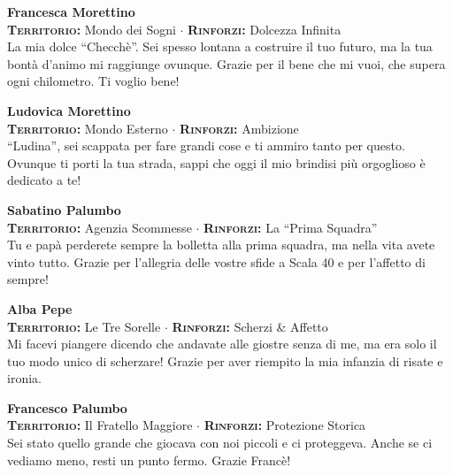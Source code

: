 \noindent\begin{minipage}{\linewidth}
\textbf{Francesca Morettino} \\
{\footnotesize \textbf{\textsc{Territorio:}} Mondo dei Sogni $\cdot$ \textbf{\textsc{Rinforzi:}} Dolcezza Infinita} \\
La mia dolce ``Checchè''. Sei spesso lontana a costruire il tuo futuro, ma la tua bontà d'animo mi raggiunge ovunque. Grazie per il bene che mi vuoi, che supera ogni chilometro. Ti voglio bene!
\end{minipage}
\vspace{0.6cm}

\noindent\begin{minipage}{\linewidth}
\textbf{Ludovica Morettino} \\
{\footnotesize \textbf{\textsc{Territorio:}} Mondo Esterno $\cdot$ \textbf{\textsc{Rinforzi:}} Ambizione} \\
``Ludina'', sei scappata per fare grandi cose e ti ammiro tanto per questo. Ovunque ti porti la tua strada, sappi che oggi il mio brindisi più orgoglioso è dedicato a te!
\end{minipage}
\vspace{0.6cm}

\noindent\begin{minipage}{\linewidth}
\textbf{Sabatino Palumbo} \\
{\footnotesize \textbf{\textsc{Territorio:}} Agenzia Scommesse $\cdot$ \textbf{\textsc{Rinforzi:}} La ``Prima Squadra''} \\
Tu e papà perderete sempre la bolletta alla prima squadra, ma nella vita avete vinto tutto. Grazie per l'allegria delle vostre sfide a Scala 40 e per l'affetto di sempre!
\end{minipage}
\vspace{0.6cm}

\noindent\begin{minipage}{\linewidth}
\textbf{Alba Pepe} \\
{\footnotesize \textbf{\textsc{Territorio:}} Le Tre Sorelle $\cdot$ \textbf{\textsc{Rinforzi:}} Scherzi \& Affetto} \\
Mi facevi piangere dicendo che andavate alle giostre senza di me, ma era solo il tuo modo unico di scherzare! Grazie per aver riempito la mia infanzia di risate e ironia.
\end{minipage}
\vspace{0.6cm}

\noindent\begin{minipage}{\linewidth}
\textbf{Francesco Palumbo} \\
{\footnotesize \textbf{\textsc{Territorio:}} Il Fratello Maggiore $\cdot$ \textbf{\textsc{Rinforzi:}} Protezione Storica} \\
Sei stato quello grande che giocava con noi piccoli e ci proteggeva. Anche se ci vediamo meno, resti un punto fermo. Grazie Francè!
\end{minipage}
\vspace{0.6cm}

